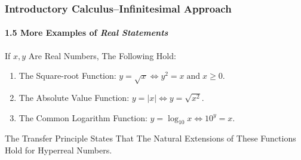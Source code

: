 \begin{frame}
\frametitle{Introductory Calculus--Infinitesimal Approach}
\framesubtitle{1.5 More Examples of \alert{\textit{Real Statements}}}
\label{slide:1.5-11}
\begin{example}
\label{ex:more-real-statements}
If $x,y$ Are Real Numbers, The Following Hold:
\begin{enumerate}
\item The Square-root Function: $y=\sqrt{x} \iff y^2=x\;\text{and}\;x\geq 0$.
\item The Absolute Value Function: $y=\mid x\mid\iff y=\sqrt{x^2}$.
\item The Common Logarithm Function: $y=\log_{10} x\iff 10^y=x$.
\end{enumerate}
\end{example}
\alert{The Transfer Principle States That The Natural Extensions of These Functions Hold for Hyperreal Numbers}.
\end{frame}
